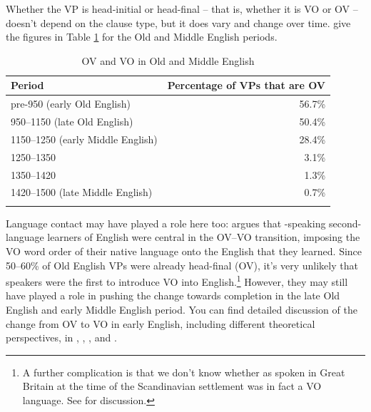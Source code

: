 \begin{multicols}{2}
\begin{exe}
\ex {}
\label{ex:OE-OV-tree}
\ex {}
\label{ex:OE-VO-tree}
\end{exe}
\end{multicols}

\noindent Whether the VP is head-initial or head-final -- that is, whether it is VO or OV -- doesn't depend on the clause type, but it does vary and change over time. \citet{PintzukTaylor2006} give the figures in Table \ref{tab:OV-VO} for the Old and Middle English periods.

\begin{table}
    \caption{OV and VO in Old and Middle English}\label{tab:OV-VO}
  \begin{tabular}{lr}
\lsptoprule
 Period & Percentage of VPs that are OV \\
    \midrule
    pre-950 (early Old English) & 56.7\%\\
    950--1150 (late Old English) & 50.4\%\\
    1150--1250 (early Middle English) & 28.4\%\\
    1250--1350 & 3.1\%\\ 
    1350--1420 & 1.3\%\\
    1420--1500 (late Middle English) & 0.7\%\\
    \lspbottomrule
  \end{tabular}
\end{table}

\noindent Language contact may have played a role here too: \citet{Trips2002} argues that -speaking second-language learners of English were central in the OV--VO transition, imposing the VO word order of their native language onto the English that they learned. Since 50--60\% of Old English VPs were already head-final (OV), it's very unlikely that  speakers were the first to introduce VO into English.\footnote{A further complication is that we don't know whether  as spoken in Great Britain at the time of the Scandinavian settlement was in fact a VO language. See \citet[71--73]{BechWalkden2016} for discussion.} However, they may still have played a role in pushing the change towards completion in the late Old English and early Middle English period. You can find detailed discussion of the change from OV to VO in early English, including different theoretical perspectives, in \citet[Chapter 5]{Fischeretal2000}, \citet[175--198 and 391--399]{Roberts2007}, \citet[§6.5]{Los2015}, and \citet[194--197]{FischerDeSmetvanderWurff2017}.


